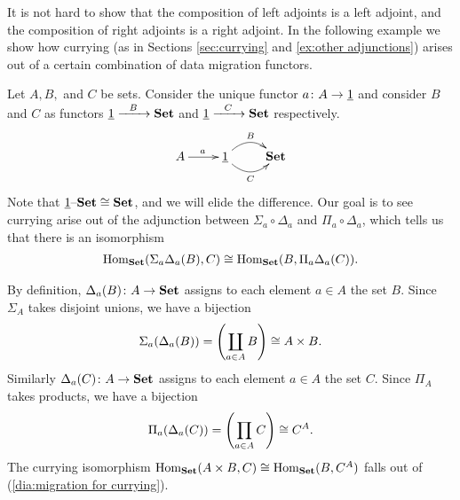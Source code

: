 \documentclass[CT4S-EN-RU]{subfiles}
\begin{document}
\begin{exampleRUS}
\end{exampleRUS}

\begin{blockENG}
It is not hard to show that the composition of left adjoints is a left adjoint, and the composition of right adjoints is a right adjoint. In the following example we show how currying (as in Sections \ref{sec:currying} and \ref{ex:other adjunctions}) arises out of a certain combination of data migration functors. 
\end{blockENG}

\begin{blockRUS}
\end{blockRUS}

\begin{exampleENG}
Let $A,B,$ and $C$ be sets. Consider the unique functor $a\colon A\rightarrow\underline{1}$ and consider $B$ and $C$ as functors $\underline{1}\xrightarrow{\ \ B\ \ }{\mathbf{Set}}$ and $\underline{1}\xrightarrow{\ \ C\ \ }{\mathbf{Set}}$ respectively. 
$$\xymatrix{A\ar[r]^a&\ul{1}\ar@/^1pc/[r]^B\ar@/_1pc/[r]_C&\Set}$$
Note that $\underline{1}{\text \textendash}{\mathbf{Set}}\cong{\mathbf{Set}}$, and we will elide the difference. Our goal is to see currying arise out of the adjunction between $\Sigma_a\circ\Delta_a$ and $\Pi_a\circ\Delta_a$, which tells us that there is an isomorphism
\begin{align}\label{dia:migration for currying}
\textnormal{Hom}_{\mathbf{Set}}(\Sigma_a\Delta_a(B),C)\cong\textnormal{Hom}_{\mathbf{Set}}(B,\Pi_a\Delta_a(C)).
\end{align}

By definition, $\Delta_a(B)\colon A\rightarrow{\mathbf{Set}}$ assigns to each element $a\in A$ the set $B$. Since $\Sigma_A$ takes disjoint unions, we have a bijection
$$\Sigma_a(\Delta_a(B))=\left(\coprod_{a\in A}B\right)\cong A\times B.$$ 
Similarly $\Delta_a(C)\colon A\rightarrow{\mathbf{Set}}$ assigns to each element $a\in A$ the set $C$. Since $\Pi_A$ takes products, we have a bijection
$$\Pi_a(\Delta_a(C))=\left(\prod_{a\in A}C\right)\cong C^A.$$
The currying isomorphism $\textnormal{Hom}_{\mathbf{Set}}(A\times B,C)\cong\textnormal{Hom}_{\mathbf{Set}}(B,C^A)$ falls out of (\ref{dia:migration for currying}).
\end{exampleENG}

\begin{exampleRUS}
\end{exampleRUS}


\subsection{}
\end{document}
